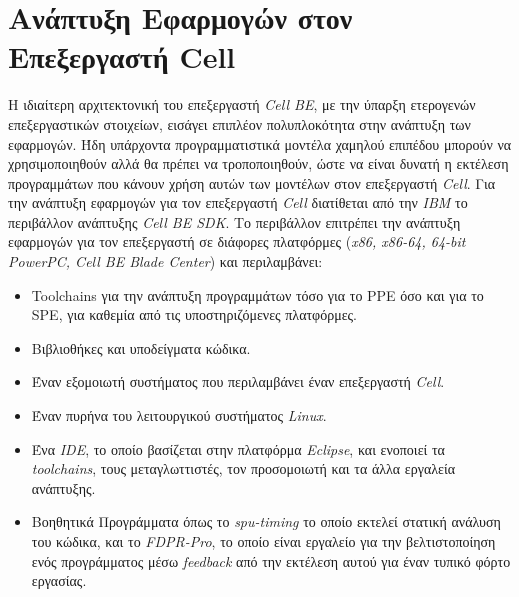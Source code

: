\section{Ανάπτυξη Εφαρμογών στον Επεξεργαστή Cell}
\label{section:sect33}
\indent
Η ιδιαίτερη αρχιτεκτονική του επεξεργαστή \textsl{Cell BE}, με την ύπαρξη ετερογενών επεξεργαστικών στοιχείων, εισάγει επιπλέον πολυπλοκότητα στην ανάπτυξη των εφαρμογών. Ήδη υπάρχοντα προγραμματιστικά μοντέλα χαμηλού επιπέδου μπορούν να χρησιμοποιηθούν αλλά θα πρέπει να τροποποιηθούν, ώστε να είναι δυνατή η εκτέλεση προγραμμάτων που κάνουν χρήση αυτών των μοντέλων στον επεξεργαστή \textsl{Cell}. Για την ανάπτυξη εφαρμογών για τον επεξεργαστή \textsl{Cell} διατίθεται από την \textsl{IBM} το περιβάλλον ανάπτυξης \textsl{Cell BE \ac{SDK}}. Το περιβάλλον επιτρέπει την ανάπτυξη εφαρμογών για τον επεξεργαστή σε διάφορες πλατφόρμες (\textsl{x86, x86-64, 64-bit PowerPC, Cell BE Blade Center}) και περιλαμβάνει:
\begin{itemize}

\item{Toolchains για την ανάπτυξη προγραμμάτων τόσο για το \ac{PPE} όσο και για το \ac{SPE}, για καθεμία από τις υποστηριζόμενες πλατφόρμες.}

\item{Βιβλιοθήκες και υποδείγματα κώδικα.}

\item{Έναν εξομοιωτή συστήματος που περιλαμβάνει έναν επεξεργαστή \textsl{Cell}.}

\item{Έναν πυρήνα του λειτουργικού συστήματος \textsl{Linux}.}

\item{Ένα \textsl{IDE}, το οποίο βασίζεται στην πλατφόρμα \textsl{Eclipse}, και ενοποιεί τα \textsl{toolchains}, τους μεταγλωττιστές, τον προσομοιωτή και τα άλλα εργαλεία ανάπτυξης.}

\item{Βοηθητικά Προγράμματα όπως το \textsl{spu-timing} το οποίο εκτελεί στατική ανάλυση του κώδικα, και το \textsl{FDPR-Pro}, το οποίο είναι εργαλείο για την βελτιστοποίηση ενός προγράμματος μέσω \textsl{feedback} από την εκτέλεση αυτού για έναν τυπικό φόρτο εργασίας.}

\end{itemize}

